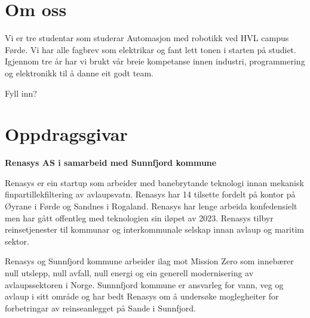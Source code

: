 
\thispagestyle{fancy}

\section{Om oss}

Vi er tre studentar som studerar Automasjon med robotikk ved HVL campus Førde.
Vi har alle fagbrev som elektrikar og fant lett tonen i starten på studiet.
Igjennom tre år har vi brukt vår breie kompetanse innen industri, programmering og elektronikk
til å danne eit godt team.

Fyll inn?


\section{Oppdragsgivar}
\textbf{Renasys AS i samarbeid med Sunnfjord kommune}

Renasys er ein startup som arbeider med banebrytande teknologi innan mekanisk finpartillekfiltering av avlaupsvatn.
Renasys har 14 tilsette fordelt på kontor på Øyrane i Førde og Sandnes i Rogaland. 
Renasys har lenge arbeida konfedensielt men har gått offentleg med teknologien sin iløpet av 2023. 
Renasys tilbyr reinsetjenester til kommunar og interkommunale selskap innan avlaup og maritim sektor.

Renasys og Sunnfjord kommune arbeider ilag mot Mission Zero som innebærer 
null utslepp, null avfall, null energi og ein generell modernisering av avlaupssektoren i Norge.
Sunnnfjord kommune er ansvarleg for vann, veg og avlaup i sitt område og har bedt 
Renasys om å undersøke moglegheiter for forbetringar av reinseanlegget på Sande i Sunnfjord.
